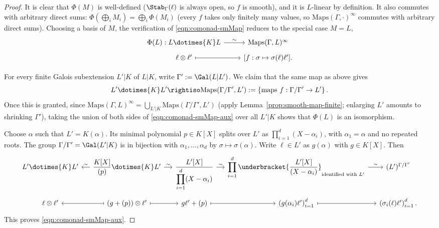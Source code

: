 \begin{proof}
	It is clear that $\Phi(M)$ is well-defined
	($\Stab_\Gamma(\ell)$ is always open, so $f$ is smooth), and it is
	$L$-linear by definition. It also commutes with arbitrary direct sums:
	$\Phi(\bigoplus_iM_i)=\bigoplus_i\Phi(M_i)$ (every $f$ takes only
	finitely many values, so $\mathrm{Maps}(\Gamma,\mathord\cdot)^\infty$
	commutes with arbitrary direct sums). Choosing a basis of $M$, the
	verification of \eqref{eqn:comonad-smMap} reduces to the special case
	$M=L$,
	\[\begin{tikzcd}[row sep=tiny]
		\Phi(L): L \dotimes{K} L \arrow[r, "\sim"] & \mathrm{Maps}(\Gamma, L)^\infty \\
		\ell \otimes \ell' \arrow[mapsto, r] & {[f: \sigma \mapsto \sigma(\ell)\ell' ]}.
	\end{tikzcd}\]

	For every finite Galois subextension $L'|K$ of $L|K$, write
	$\Gamma':=\Gal(L|L')$. We claim that the same map as above gives
	\begin{equation}\label{eqn:comonad-smMap-aux}
		L' \dotimes{K} L' \rightiso \mathrm{Maps}(\Gamma/\Gamma', L') := \left\{\text{maps } f: \Gamma/\Gamma' \to L' \right\}.
	\end{equation}
	Once this is granted, since
	$\mathrm{Maps}(\Gamma,L)^\infty=
	\bigcup_{L'|K}\mathrm{Maps}(\Gamma/\Gamma',L')$
	(apply Lemma~\ref{prop:smooth-map-finite}; enlarging $L'$ amounts to
	shrinking $\Gamma'$), taking the union of both sides of
	\eqref{eqn:comonad-smMap-aux} over all $L'|K$ shows that $\Phi(L)$ is an
	isomorphism.

	Choose $\alpha$ such that $L'=K(\alpha)$. Its minimal polynomial
	$p\in K[X]$ splits over $L'$ as $\prod_{i=1}^d(X-\alpha_i)$, with
	$\alpha_1=\alpha$ and no repeated roots. The group
	$\Gamma/\Gamma'=\Gal(L'|K)$ is in bijection with
	$\alpha_1,\ldots,\alpha_d$ by $\sigma\mapsto\sigma(\alpha)$. Write
	$\ell\in L'$ as $g(\alpha)$ with $g\in K[X]$. Then
	\[\begin{tikzcd}[row sep=tiny, column sep=small]
		L' \dotimes{K} L' & \dfrac{K[X]}{(p)} \dotimes{K} L' \arrow[l, "\sim"'] \arrow[r, "\sim"] & \dfrac{L'[X]}{\displaystyle\prod_{i=1}^d (X - \alpha_i)} \arrow[r, "\sim"] & \displaystyle\prod_{i=1}^d \underbracket{\dfrac{L'[X]}{(X - \alpha_i)}}_{\text{identified with } L'} \arrow[r, "\sim"] & (L')^{\Gamma/\Gamma'} \\
		\ell \otimes \ell' & (g + (p)) \otimes \ell' \arrow[mapsto, l] \arrow[mapsto, r] & g\ell' + (p) \arrow[mapsto, r] & \left( g(\alpha_i) \ell' \right)_{i=1}^d \arrow[mapsto, r] & \left( \sigma_i(\ell) \ell' \right)_{i=1}^d.
	\end{tikzcd}\]
	This proves \eqref{eqn:comonad-smMap-aux}.
\end{proof}

